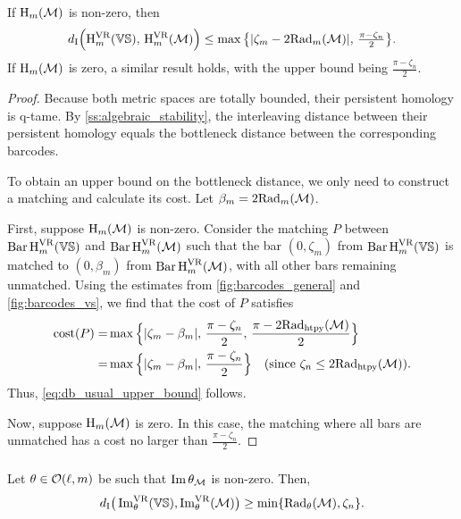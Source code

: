 \medskip\lemma
If \( \opH_m(\cM) \) is non-zero, then
\begin{equation}\label{eq:db_usual_upper_bound}
    \di\Big(\rH^{\VR}_{m}(\VS),\, \rH^{\VR}_{m}(\cM)\Big)
	\leq \max\big\{|\zeta_m  - 2\firstdeath{m}{\cM} |,\, \tfrac{\pi - \zeta_n}{2}\big\}.
\end{equation}
If \( \opH_m(\cM) \) is zero, a similar result holds, with the upper bound being $\tfrac{\pi - \zeta_n}{2}$.

\begin{proof}
    Because both metric spaces are totally bounded, their persistent homology is q-tame.
    By \cref{ss:algebraic_stability}, the interleaving distance between their persistent homology equals the bottleneck distance between the corresponding barcodes.

    To obtain an upper bound on the bottleneck distance, we only need to construct a matching and calculate its cost. Let \( \beta_m = 2\firstdeath{m}{\cM} \).

    First, suppose \( \opH_m(\cM) \) is non-zero.
    Consider the matching \( P \) between \( \Hbarc[\field]{m}{\VS} \) and \( \Hbarc[\field]{m}{\cM} \) such that the bar \( (0, \zeta_m) \) from \( \Hbarc[\field]{m}{\VS} \) is matched to \( (0, \beta_m) \) from \( \Hbarc[\field]{m}{\cM} \), with all other bars remaining unmatched. Using the estimates from \cref{fig:barcodes_general} and \cref{fig:barcodes_vs}, we find that the cost of \( P \) satisfies
    \begin{align*}
        \cost(P)
        = & \max\Big\{|\zeta_m - \beta_m|,\, \frac{\pi - \zeta_n}{2},\, \frac{\pi - 2\crit(\cM)}{2}\Big\} \\
        = & \max\Big\{|\zeta_m - \beta_m|,\, \frac{\pi - \zeta_n}{2}\Big\} \quad \text{(since \( \zeta_n \leq 2\crit(\cM) \))}.
    \end{align*}
    Thus, \cref{eq:db_usual_upper_bound} follows.

    Now, suppose \( \opH_m(\cM) \) is zero. In this case, the matching where all bars are unmatched has a cost no larger than \( \frac{\pi - \zeta_n}{2}\).
\end{proof}

\subsubsection{}\label{sss:db_theta_lower_bound}

\medskip\lemma
Let $\theta \in \cO(\ell, m)$ be such that $\img \theta_\cM$ is non-zero.
Then,
\begin{equation}\label{eq:db_theta_lower_bound}
	\di\big(\img^{\VR}_{\theta}(\VS), \img^{\VR}_{\theta}(\cM)\big)
	\geq \min\{\firstdeath{\theta}{\cM}, \zeta_n\}. %
\end{equation}

